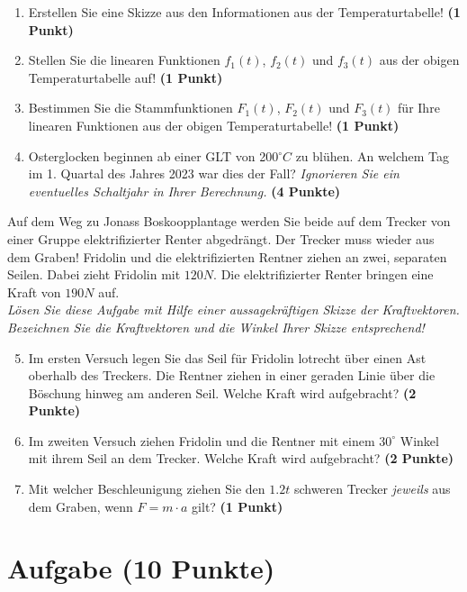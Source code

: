 \documentclass[a4paper, 9pt]{scrartcl}\usepackage[]{graphicx}\usepackage[]{xcolor}
\begin{document}
\begin{enumerate}
\item Erstellen Sie eine Skizze aus den Informationen aus der Temperaturtabelle!  \textbf{(1 Punkt)}
\item Stellen Sie die linearen Funktionen $f_1(t)$, $f_2(t)$ und $f_3(t)$ aus der obigen Temperaturtabelle auf!  \textbf{(1 Punkt)}
\item Bestimmen Sie die Stammfunktionen $F_1(t)$, $F_2(t)$ und $F_3(t)$ für Ihre linearen Funktionen aus der obigen Temperaturtabelle!  \textbf{(1 Punkt)}
\item Osterglocken beginnen ab einer GLT von 200$^\circ C$ zu blühen. An welchem Tag im 1. Quartal des Jahres 2023 war dies der Fall? \textit{Ignorieren Sie ein eventuelles Schaltjahr in Ihrer Berechnung.} \textbf{(4 Punkte)}
\end{enumerate}

Auf dem Weg zu Jonass Boskoopplantage werden Sie beide auf dem Trecker von einer Gruppe elektrifizierter Renter abgedrängt. Der Trecker muss wieder aus dem Graben! Fridolin und die elektrifizierten Rentner ziehen an zwei, separaten Seilen. Dabei zieht Fridolin mit $120N$. Die elektrifizierter Renter  bringen eine Kraft von $190N$ auf.\\

\textit{Lösen Sie diese Aufgabe mit Hilfe einer aussagekräftigen Skizze der Kraftvektoren. Bezeichnen Sie die Kraftvektoren und die Winkel Ihrer Skizze entsprechend!}

\begin{enumerate}
  \setcounter{enumi}{4}  
\item Im ersten Versuch legen Sie das Seil für Fridolin lotrecht über einen Ast oberhalb des Treckers. Die Rentner ziehen in einer geraden Linie über die Böschung hinweg am anderen Seil. Welche Kraft wird aufgebracht?  \textbf{(2 Punkte)}
\item Im zweiten Versuch ziehen Fridolin und die Rentner mit einem $30^\circ$ Winkel mit ihrem Seil an dem Trecker. Welche Kraft wird aufgebracht? \textbf{(2 Punkte)}
\item Mit welcher Beschleunigung ziehen Sie den $1.2t$ schweren Trecker \textit{jeweils} aus dem Graben, wenn $F = m \cdot a$ gilt? \textbf{(1 Punkt)}
\end{enumerate}

 
\clearpage

\section{Aufgabe \hfill (10 Punkte)}
\end{document}
